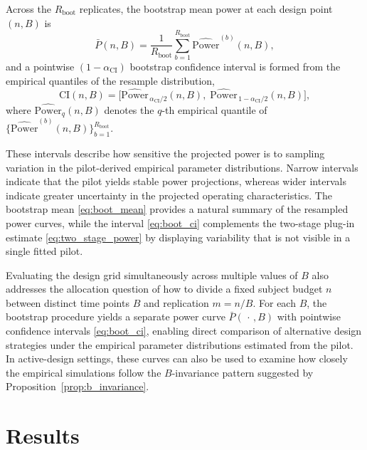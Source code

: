 \documentclass{article}
\begin{document}
Across the $R_{\mathrm{boot}}$ replicates, the bootstrap mean power at each
design point $(n,B)$ is
\begin{equation}
\bar{P}(n,B)
=
\frac{1}{R_{\mathrm{boot}}}
\sum_{b=1}^{R_{\mathrm{boot}}}
\widehat{\mathrm{Power}}^{(b)}(n,B),
\label{eq:boot_mean}
\end{equation}
and a pointwise $(1-\alpha_{\mathrm{CI}})$ bootstrap confidence interval is
formed from the empirical quantiles of the resample distribution,
\begin{equation}
\mathrm{CI}(n,B)
=
\bigl[
\widehat{\mathrm{Power}}_{\,\alpha_{\mathrm{CI}}/2}(n,B),\;
\widehat{\mathrm{Power}}_{\,1-\alpha_{\mathrm{CI}}/2}(n,B)
\bigr],
\label{eq:boot_ci}
\end{equation}
where $\widehat{\mathrm{Power}}_q(n,B)$ denotes the $q$-th empirical quantile
of $\bigl\{\widehat{\mathrm{Power}}^{(b)}(n,B)\bigr\}_{b=1}^{R_{\mathrm{boot}}}$.

These intervals describe how sensitive the projected power is to sampling
variation in the pilot-derived empirical parameter distributions. Narrow
intervals indicate that the pilot yields stable power projections, whereas
wider intervals indicate greater uncertainty in the projected operating
characteristics. The bootstrap mean
\eqref{eq:boot_mean} provides a natural summary of the resampled power curves,
while the interval \eqref{eq:boot_ci} complements the two-stage plug-in
estimate \eqref{eq:two_stage_power} by displaying variability that is not
visible in a single fitted pilot.

Evaluating the design grid simultaneously across multiple values of $B$
also addresses the allocation question of how to divide a fixed subject budget
$n$ between distinct time points $B$ and replication $m=n/B$. For each $B$,
the bootstrap procedure yields a separate power curve $\bar{P}(\,\cdot\,,B)$
with pointwise confidence intervals \eqref{eq:boot_ci}, enabling direct
comparison of alternative design strategies under the empirical parameter
distributions estimated from the pilot. In active-design settings, these curves
can also be used to examine how closely the empirical simulations follow the
$B$-invariance pattern suggested by Proposition~\ref{prop:b_invariance}.


\section{Results}
\end{document}
